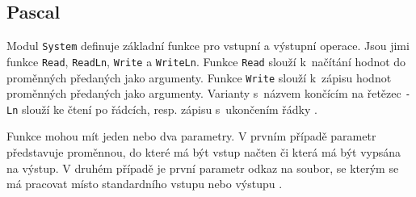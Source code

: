 \documentclass[onepage, a4paper, 12pt]{bakalarka}
\begin{document}
\subsection{Pascal}
Modul \texttt{System} definuje základní funkce pro vstupní a výstupní operace. Jsou jimi funkce \texttt{Read}, \texttt{ReadLn}, \texttt{Write} a \texttt{WriteLn}. Funkce \texttt{Read} slouží k~načítání hodnot do proměnných předaných jako argumenty. Funkce \texttt{Write} slouží k~zápisu hodnot proměnných předaných jako argumenty. Varianty s~názvem končícím na řetězec \texttt{-Ln} slouží ke čtení po řádcích, resp. zápisu s~ukončením řádky \cite{pas-guide-system, pas-guide-read, pas-guide-write, pas-guide-readln, pas-guide-writeln}.\par
Funkce mohou mít jeden nebo dva parametry. V prvním případě parametr představuje proměnnou, do které má být vstup načten či která má být vypsána na výstup. V druhém případě je první parametr odkaz na soubor, se kterým se má pracovat místo standardního vstupu nebo výstupu \cite{pas-guide-read, pas-guide-write, pas-guide-readln, pas-guide-writeln}.

\appendix


\end{document}
